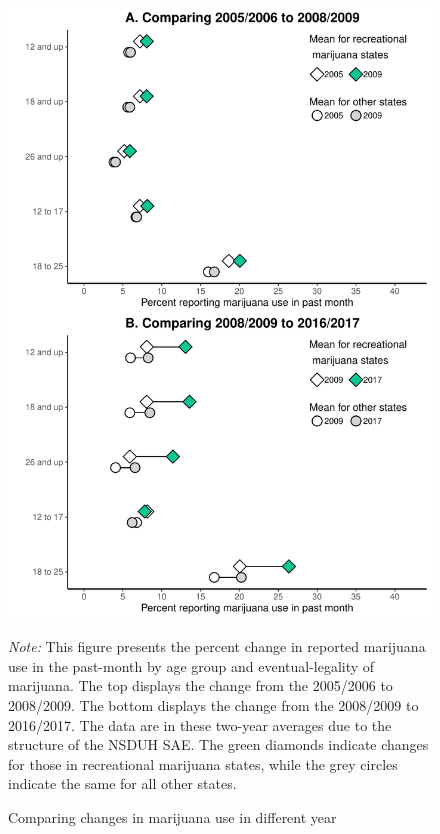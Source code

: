 \documentclass[12pt]{article}%
\begin{document}
\begin{figure}[H]
    \caption{Comparing changes in marijuana use in different year}
    \begin{minipage}{.6\linewidth}
          \includegraphics[width=\linewidth]{../output/plots/change-in-use-raw-data-additional-and-placebo.pdf}
                \begin{justify}
                    {\footnotesize
                        \emph{Note:} 
                        This figure presents the percent change in reported marijuana use in the past-month by age group and eventual-legality of marijuana. 
                        The top displays the change from the 2005/2006 to 2008/2009. 
                        The bottom displays the change from the 2008/2009 to 2016/2017. 
                        The data are in these two-year averages due to the structure of the NSDUH SAE.   
                        The green diamonds indicate changes for those in recreational marijuana states, while the grey circles indicate the same for all other states. 
                                \par}
                \end{justify}
    \end{minipage}
      \label{fig:change-in-mj-use-referee}
\end{figure}
\end{document}
